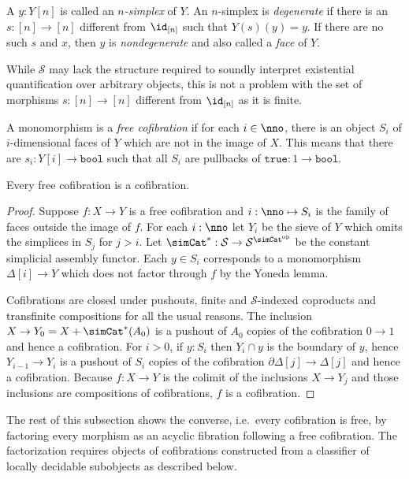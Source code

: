 \documentclass{tac}
\newcommand\cat\mathcal
\newcommand\ri{^*}
\newcommand\dual{^{\mathrm{op}}}
\newcommand\s{^{\simCat\dual}}
\newcommand\of{:}
\newcommand\simplex\Delta
\newcommand\cycle{\partial\Delta}
\newcommand\true{\mathtt{true}}
\newcommand\bool{\mathtt{bool}}
\begin{document}
\begin{definition} A $y\of Y[n]$ is called an \emph{$n$-simplex} of $Y$. An $n$-simplex is \emph{degenerate} if there is an $s\of [n]\to [n]$ different from $\id_{[n]}$ such that $Y(s)(y)=y$. If there are no such $s$ and $x$, then $y$ is \emph{nondegenerate} and also called a \emph{face} of $Y$.\end{definition}

While $\cat S$ may lack the structure required to soundly interpret existential quantification over arbitrary objects, this is not a problem with the set of morphisms $s\of [n]\to [n]$ different from $\id_{[n]}$ as it is finite.

\begin{definition} A monomorphism is a \emph{free cofibration} if for each $i\in \nno$, there is an object $S_i$ of $i$-dimensional faces of $Y$ which are not in the image of $X$. This means that there are $s_i:Y[i]\to\bool$ such that all $S_i$ are pullbacks of $\true:1\to\bool$.
\end{definition}

\begin{lemma} Every free cofibration is a cofibration. \label{Reedy}
\end{lemma}

\begin{proof} Suppose $f\of X\to Y$ is a free cofibration and $i\of\nno\mapsto S_i$ is the family of faces outside the image of $f$. 
For each $i\of\nno$ let $Y_i$ be the sieve of $Y$ which omits the simplices in $S_j$ for $j>i$.
Let $\simCat\ri\of \cat S\to\cat S\s$ be the constant simplicial assembly functor. 
Each $y\in S_i$ corresponds to a monomorphism $\simplex[i]\to Y$ which does not factor through $f$ by the Yoneda lemma.

Cofibrations are closed under pushouts, finite and $\cat S$-indexed coproducts and transfinite compositions for all the usual reasons.
The inclusion $X\to Y_0 = X+\simCat\ri(A_0)$ is a pushout of $A_0$ copies of the cofibration $0\to 1$ and hence a cofibration.
For $i>0$, if $y\of S_i$ then $Y_i\cap y$ is the boundary of $y$, hence $Y_{i-1}\to Y_i$ is a pushout of $S_i$ copies of the cofibration $\cycle[j]\to\simplex[j]$ and hence a cofibration. Because $f\of X\to Y$ is the colimit of the inclusions $X\to Y_j$ and those inclusions are compositions of cofibrations, $f$ is a cofibration.
\end{proof}

The rest of this subsection shows the converse, i.e.\ every cofibration is free, by factoring every morphism as an acyclic fibration following a free cofibration. The factorization requires objects of cofibrations constructed from a classifier of locally decidable subobjects as described below.
\end{document}
